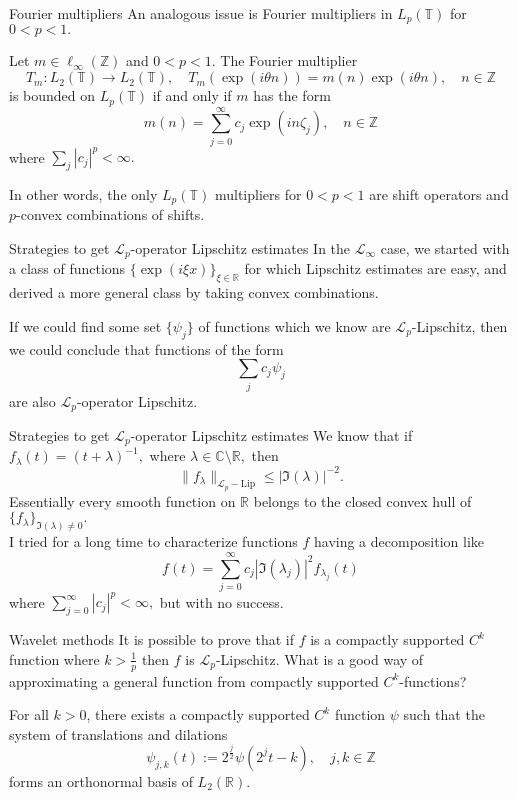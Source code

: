 \documentclass{beamer}
\numberwithin{equation}{section}
\theoremstyle{plain}
\theoremstyle{plain}
\theoremstyle{definition}
\theoremstyle{plain}
\theoremstyle{plain}
\theoremstyle{definition}
\newcommand{\Rl}{\mathbb{R}}
\newcommand{\Cplx}{\mathbb{C}}
\newcommand{\Itgr}{\mathbb{Z}}
\newcommand{\Circ}{\mathbb{T}}
\newcommand{\Lc}{\mathcal{L}}
\begin{document}
\begin{frame}{Fourier multipliers}
    An analogous issue is Fourier multipliers in $L_p(\Circ)$ for $0<p<1.$
    \begin{theorem}
        Let $m \in \ell_{\infty}(\Itgr)$ and $0<p<1.$ The Fourier multiplier
        \[
            T_m:L_2(\Circ)\to L_2(\Circ),\quad T_m(\exp(i\theta n)) = m(n)\exp(i\theta n),\quad n\in \Itgr
        \]
        is bounded on $L_p(\Circ)$ if and only if $m$ has the form
        \[
            m(n) = \sum_{j=0}^\infty c_j \exp(in\zeta_j),\quad n\in \Itgr
        \]
        where $\sum_{j} |c_j|^p < \infty.$
    \end{theorem}
    In other words, the only $L_p(\Circ)$ multipliers for $0<p<1$ are shift operators and $p$-convex combinations of shifts.
\end{frame}

\begin{frame}{Strategies to get $\Lc_p$-operator Lipschitz estimates}
    In the $\Lc_{\infty}$ case, we started with a class of functions $\{\exp(i\xi x)\}_{\xi\in \Rl}$ for which Lipschitz estimates are easy, and derived a more general class by taking convex combinations.

    If we could find some set $\{\psi_j\}$ of functions which we know are $\Lc_p$-Lipschitz, then we could conclude that functions of the form
    \[
        \sum_j c_j\psi_j
    \]
    are also $\Lc_p$-operator Lipschitz.
\end{frame}

\begin{frame}{Strategies to get $\Lc_p$-operator Lipschitz estimates}
    We know that if $f_\lambda(t) = (t+\lambda)^{-1},$ where $\lambda\in \Cplx\setminus \Rl,$ then
    \[
        \|f_{\lambda}\|_{\Lc_p-\mathrm{Lip}} \leq |\Im(\lambda)|^{-2}.
    \]
    Essentially every smooth function on $\Rl$ belongs to the closed convex hull of $\{f_\lambda\}_{\Im(\lambda)\neq 0}.$\\
    \pause
    I tried for a long time to characterize functions $f$ having a decomposition like
    \[
        f(t) = \sum_{j=0}^\infty c_j|\Im(\lambda_j)|^2f_{\lambda_j}(t)
    \]
    where $\sum_{j=0}^\infty |c_j|^p < \infty,$ but with no success.
\end{frame}

\begin{frame}{Wavelet methods}
    It is possible to prove that if $f$ is a compactly supported $C^k$ function where $k > \frac{1}{p}$ then $f$ is $\Lc_p$-Lipschitz.
    \pause
    What is a good way of approximating a general function from compactly supported $C^k$-functions?\pause
    \begin{theorem}[Daubechies (1988)]
        For all $k>0$, there exists a compactly supported $C^k$ function $\psi$ such that the system of translations
        and dilations
        \begin{equation*}
            \psi_{j,k}(t) := 2^{\frac{j}{2}}\psi(2^jt-k),\quad j,k\in \Itgr
        \end{equation*}
        forms an orthonormal basis of $L_2(\Rl).$
    \end{theorem}
\end{frame}
\end{document}
